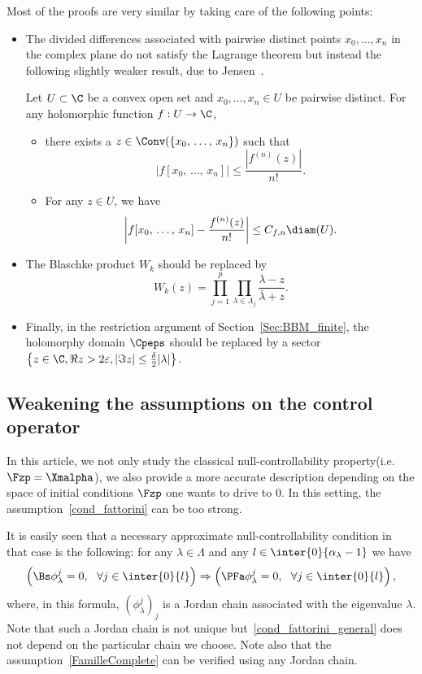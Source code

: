 Most of the proofs are very similar by taking care of the following points:
\begin{itemize}
\item The divided differences associated with pairwise distinct points $x_0,\dotsc,x_n$ in the complex plane do not satisfy the Lagrange theorem but instead the following slightly weaker result, due to Jensen~\cite{Jensen_1894}.
\begin{prop}
Let $U\subset \C$ be a convex open set and $x_0,\dotsc,x_n\in U$ be pairwise distinct. For any holomorphic function $f:U\to \C$,
\begin{itemize}
\item there exists a $z\in \Conv(\{x_0,\,\dotsc,\,x_n\})$ such that
\[
|f[x_0,\,\dotsc,\,x_n]| \leq \frac{\left|f^{(n)}(z)\right|}{n!}.
\]
\item For any $z\in U$, we have
\[
\left|f[x_0,\,\dotsc,\,x_n] - \frac{f^{(n)}(z)}{n!}\right| \leq C_{f,n} \diam(U).
\]
\end{itemize}
\end{prop}
\item The Blaschke product $W_k$ should be replaced by
\[
W_k(z)=\prod_{j=1}^p \prod_{\lambda\in \Lambda_j} \frac{\lambda - z}{\bar{\lambda} + z}.
\]
\item Finally, in the restriction argument of Section~\ref{Sec:BBM_finite}, the holomorphy domain $\Cpeps$ should be replaced by a sector $\left\{z\in \C, \Re z>2\varepsilon, |\Im z|\leq \frac{\delta}{2} |\lambda|\right\}$.
\end{itemize}


\subsection{Weakening the assumptions on the control operator} \label{Sec:Gestion_de_B*}

In this article, we not only study the classical null-controllability property\linebreak(i.e.$\Fzp=\Xmalpha$), we also provide a more accurate description depending on the space of initial conditions $\Fzp$ one wants to drive to $0$. In this setting, the assumption~\eqref{cond_fattorini} can be too strong.

It is easily seen that a necessary approximate null-controllability condition in that case is the following: for any $\lambda\in \Lambda$ and any $l\in \inter{0}{\alpha_\lambda-1}$ we have
\begin{equation}\label{cond_fattorini_general}
\left(\Bs \phi_\lambda^j=0, \ \ \forall j\in \inter{0}{l}\right) \Rightarrow \left(\PFa \phi_\lambda^j=0, \ \ \forall j\in\inter{0}{l}\right),
\end{equation}
where, in this formula, $(\phi_\lambda^j)_j$ is a Jordan chain associated with the eigenvalue $\lambda$. Note that such a Jordan chain is not unique but~\eqref{cond_fattorini_general} does not depend on the particular chain we choose. Note also that the assumption~\eqref{FamilleComplete} can be verified using any Jordan chain.

